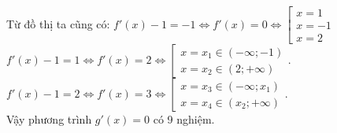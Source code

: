 \begin{ex}
{		Từ đồ thị ta cũng có:	
		$f'(x)-1=-1 \Leftrightarrow f'(x)=0 \Leftrightarrow\left[\begin{array}{l}x=1 \\ x=-1 \\ x=2\end{array}\right.$\\		
		$f'(x)-1=1 \Leftrightarrow f'(x)=2 \Leftrightarrow\left[\begin{array}{l}x=x_{1} \in(-\infty ;-1) \\ x=x_{2} \in(2 ;+\infty)\end{array}\right.$.		\\
		$f'(x)-1=2 \Leftrightarrow f'(x)=3 \Leftrightarrow\left[\begin{array}{l}x=x_{3} \in\left(-\infty ; x_{1}\right) \\ x=x_{4} \in\left(x_{2} ;+\infty\right)\end{array}\right.$.\\
		Vậy phương trình $g'(x)=0$ có 9 nghiệm. 
	}
\end{ex}
